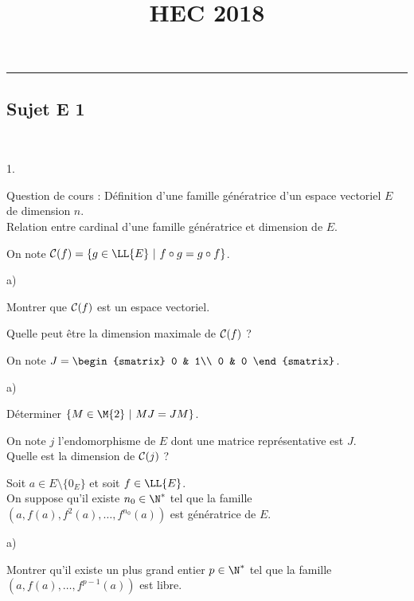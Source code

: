 \documentclass[11pt]{article}%
\title{\bf \vspace{-1.6cm} HEC 2018} %
\author{} %
\date{} %
\begin{document}
\maketitle %
\vspace{-1.2cm}\hrule %
\thispagestyle{fancy}

\vspace*{.2cm}


\subsection*{Sujet E 1}

\begin{exerciceAP}~
  \begin{noliste}{1.}
    \item Question de cours : Définition d'une famille génératrice
    d'un espace vectoriel $E$ de dimension $n$.\\
    Relation entre cardinal d'une famille génératrice et dimension 
    de $E$.
    
    \item On note ${\cal C}(f) = \{g \in \LL{E} \ | \ f \circ g = 
    g \circ f \}$.
    \begin{noliste}{a)}
      \item Montrer que ${\cal C}(f)$ est un espace vectoriel.
      
      \item Quelle peut être la dimension maximale de ${\cal C}(f)$ ?
    \end{noliste}
    
    \item On note $J = 
    \begin{smatrix}
      0 & 1\\
      0 & 0
    \end{smatrix}$.
    \begin{noliste}{a)}
      \item Déterminer $\{ M \in \M{2} \ | \ MJ = JM\}$.
      
      \item On note $j$ l'endomorphisme de $E$ dont une matrice 
      représentative est $J$. \\
      Quelle est la dimension de ${\cal C}(j)$ ?
    \end{noliste}
    
  \item Soit $a \in E \setminus \{0_E\}$ et soit $f \in \LL{E}$.\\
    On suppose qu'il existe $n_0 \in \N^*$ tel que la famille $(a,
    f(a), f^2(a), \ldots, f^{n_0}(a))$ est génératrice de $E$.
    \begin{noliste}{a)}
      \item Montrer qu'il existe un plus grand entier $p\in \N^*$ tel 
      que la famille $(a, f(a), \ldots, f^{p-1}(a))$ est libre.
      

\end{noliste}
\end{noliste}
\end{exerciceAP}
\end{document}
